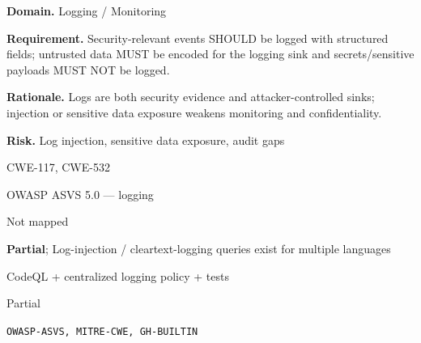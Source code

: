 \documentclass[10pt,letterpaper]{article}
\newcommand{\prioritybadge}[2]{\tcbox[on line,boxrule=0pt,arc=1.2mm,boxsep=0.7mm,left=1mm,right=1mm,top=0.4mm,bottom=0.4mm,colback=#2!12,coltext=#2]{\scriptsize\bfseries #1}}
\begin{document}
\begin{rulebox}[title={\texttt{SCS-ALL-LOG-001} \hfill \prioritybadge{High Priority}{High}}]
\textbf{Domain.} Logging / Monitoring

\textbf{Requirement.} Security-relevant events SHOULD be logged with structured fields; untrusted data MUST be encoded for the logging sink and secrets/sensitive payloads MUST NOT be logged.

\textbf{Rationale.} Logs are both security evidence and attacker-controlled sinks; injection or sensitive data exposure weakens monitoring and confidentiality.

\textbf{Risk.} Log injection, sensitive data exposure, audit gaps

\begin{description}[leftmargin=2.65cm,labelwidth=2.3cm,style=nextline,itemsep=1pt,topsep=3pt]
  \item[CWE] CWE-117, CWE-532
  \item[OWASP] OWASP ASVS 5.0 --- logging
  \item[CERT] Not mapped
  \item[CodeQL] \textbf{Partial}; Log-injection / cleartext-logging queries exist for multiple languages
  \item[Enforcement] CodeQL + centralized logging policy + tests
  \item[Automation] Partial
  \item[Sources] \texttt{OWASP-ASVS, MITRE-CWE, GH-BUILTIN}
\end{description}
\end{rulebox}
\end{document}
